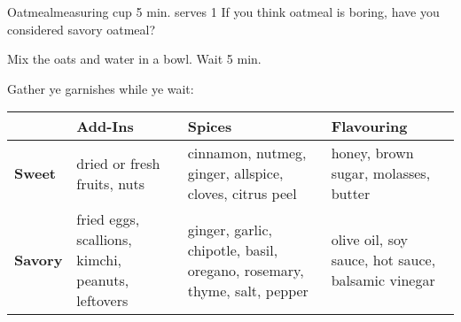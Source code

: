 \begin{recipe}{Oatmeal}{measuring cup \hfill 5 min.}{ \hfill serves 1}
 \freeform If you think oatmeal is boring, have you considered savory oatmeal?

 Mix the oats and water in a bowl. Wait 5 min.

 \freeform Gather ye garnishes while ye wait:
 \begin{center}
  \begin{tabular}{>{\centering\arraybackslash}m{}*{3}{|>{\centering\arraybackslash}m{0.25\textwidth}}}
                   & \textbf{Add-Ins}                                  & \textbf{Spices}                                                         & \textbf{Flavouring}                               \\
   \hline
   \textbf{Sweet}  & dried or fresh fruits, nuts                       & cinnamon, nutmeg, ginger, allspice, cloves, citrus peel                 & honey, brown sugar, molasses, butter              \\
   \hline
   \textbf{Savory} & fried eggs, scallions, kimchi, peanuts, leftovers & ginger, garlic, chipotle, basil, oregano, rosemary, thyme, salt, pepper & olive oil, soy sauce, hot sauce, balsamic vinegar \\
  \end{tabular}
 \end{center}
\end{recipe}

